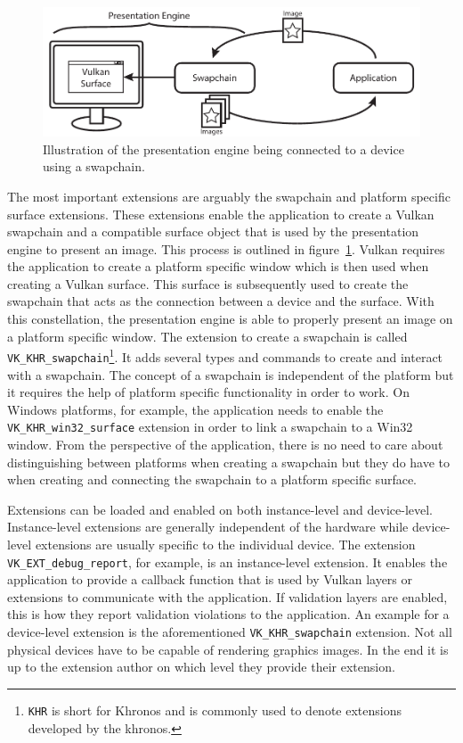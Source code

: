     \begin{figure}
      \centering
      \includegraphics[width=\textwidth]{Main/Images/PresentationEngine}
      \caption{Illustration of the presentation engine being connected to a device using a swapchain.}
      \label{fig:PresentationEngine}
    \end{figure}

    The most important extensions are arguably the swapchain and platform specific surface extensions.
    These extensions enable the application to create a Vulkan swapchain and a compatible surface object that is used by the presentation engine to present an image.
    This process is outlined in figure~\ref{fig:PresentationEngine}.
    Vulkan requires the application to create a platform specific window which is then used when creating a Vulkan surface.
    This surface is subsequently used to create the swapchain that acts as the connection between a device and the surface.
    With this constellation, the presentation engine is able to properly present an image on a platform specific window.
    The extension to create a swapchain is called
    \lstinline{VK_KHR_swapchain}\footnote{\lstinline{KHR} is short for Khronos and is commonly used to denote extensions developed by the \gls{khronos}.}.
    It adds several types and commands to create and interact with a swapchain.
    The concept of a swapchain is independent of the platform but it requires the help of platform specific functionality in order to work.
    On Windows platforms, for example, the application needs to enable the \lstinline{VK_KHR_win32_surface} extension in order to link a swapchain to a Win32 window.
    From the perspective of the application, there is no need to care about distinguishing between platforms when creating a swapchain but they do have to when creating and connecting the swapchain to a platform specific surface.

    Extensions can be loaded and enabled on both instance-level and device-level.
    Instance-level extensions are generally independent of the hardware while device-level extensions are usually specific to the individual device.
    The extension \lstinline{VK_EXT_debug_report}, for example, is an instance-level extension.
    It enables the application to provide a callback function that is used by Vulkan layers or extensions to communicate with the application.
    If validation layers are enabled, this is how they report validation violations to the application.
    An example for a device-level extension is the aforementioned \lstinline{VK_KHR_swapchain} extension.
    Not all physical devices have to be capable of rendering graphics images.
    In the end it is up to the extension author on which level they provide their extension.

